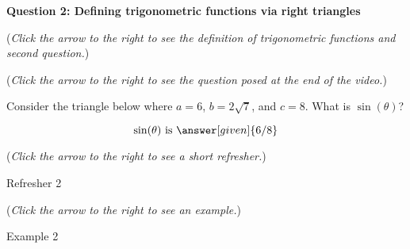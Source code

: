 \documentclass{ximera}
\begin{document}
\textbf{Question 2: Defining trigonometric functions via right triangles}
\begin{question}
\begin{flushright}
{\color{blue}(\emph{Click the arrow to the right to see the definition
of trigonometric functions and second question.})}
\end{flushright}
\begin{center}
\begin{expandable}
\begin{flushright}
{\color{blue}(\emph{Click the arrow to the right to see the question
posed at the end of the video.})}
\end{flushright}
\begin{expandable}
\begin{center}
\begin{image}
\end{image}
\end{center}
Consider the triangle below where $a = 6$, $b=2\sqrt{7}$,
and $c=8$. What is $\sin( \theta)$?\\
\begin{prompt}
\[
\sin(\theta)\text{ is }\answer[given]{6/8}
\]
\end{prompt}
\begin{flushright}
{\color{blue}(\emph{Click the arrow to the right to see a short refresher.})}
\end{flushright}
\begin{expandable}
\begin{center}
Refresher 2
\end{center}
\end{expandable}
\begin{flushright}
{\color{blue}(\emph{Click the arrow to the right to see an example.})}
\end{flushright}
\begin{expandable}
\begin{center}
Example 2
\end{center}
\end{expandable}
\end{expandable}
\end{expandable}
\end{center}
\end{question}
\end{document}
